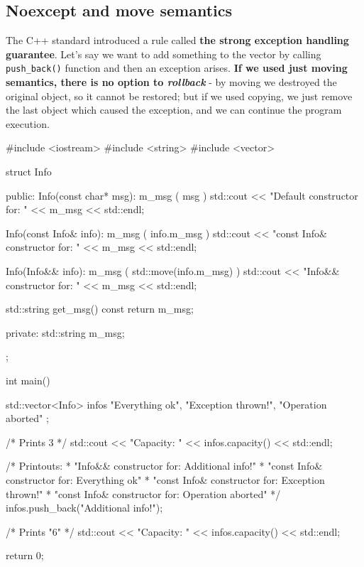 \documentclass[../main]{subfiles}
\begin{document}
\subsection{Noexcept and move semantics}
    The C++ standard introduced a rule called \textbf{the strong exception handling guarantee}.
Let's say we want to add something to the vector
by calling \texttt{push\_back()} function and then an exception arises.
\textbf{ If we used just moving semantics, there is no option to 
\textit{rollback}} - by moving we destroyed the original object,
so it cannot be restored; but if we used copying, we just remove
the last object which caused the exception, and we can
continue the program execution.
\begin{Code}
    #include <iostream>
    #include <string>
    #include <vector>
    
    struct Info
    {
    public:
        Info(const char* msg): m_msg ( msg )
        {
            std::cout << "Default constructor for: "
                      << m_msg << std::endl;
        }
    
        Info(const Info& info): m_msg ( info.m_msg )
        {
            std::cout << "const Info& constructor for: "
                      << m_msg << std::endl;
        }
    
        Info(Info&& info): m_msg ( std::move(info.m_msg) )
        {
            std::cout << "Info&& constructor for: "
                      << m_msg << std::endl;
        }
    
        std::string get_msg() const
        {
            return m_msg;
        }
    
    private:
        std::string m_msg;
    };
    
    int main()
    {
        std::vector<Info> infos
        {
            "Everything ok",
            "Exception thrown!",
            "Operation aborted"
        };
        
        /* Prints 3 */
        std::cout << "Capacity: " << infos.capacity() << std::endl;
    
        /* Printouts:
         * "Info&& constructor for: Additional info!"
         * "const Info& constructor for: Everything ok"
         * "const Info& constructor for: Exception thrown!"
         * "const Info& constructor for: Operation aborted"
         */
        infos.push_back("Additional info!");
        
        /* Prints "6" */
        std::cout << "Capacity: " << infos.capacity() << std::endl;
    
        return 0;
    }
\end{Code}
\end{document}
